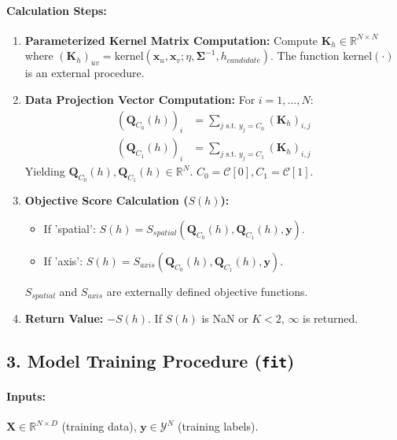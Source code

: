 \documentclass{article}
\newcommand{\mat}[1]{\mathbf{#1}} %
\newcommand{\vecbf}[1]{\bm{#1}} %
\begin{document}
\paragraph{Calculation Steps:}
\begin{enumerate}
    \item \textbf{Parameterized Kernel Matrix Computation:}
    Compute $\mat{K}_h \in \mathbb{R}^{N \times N}$ where $(\mat{K}_h)_{uv} = \text{kernel}(\vecbf{x}_u, \vecbf{x}_v; \eta, \mat{\Sigma}^{-1}, h_{candidate})$.
    The function $\text{kernel}(\cdot)$ is an external procedure.

    \item \textbf{Data Projection Vector Computation:} For $i=1, \dots, N$:
    \begin{align*}
        (\vecbf{Q}_{C_0}(h))_i &= \sum_{j \text{ s.t. } y_j = C_0} (\mat{K}_h)_{i,j} \\
        (\vecbf{Q}_{C_1}(h))_i &= \sum_{j \text{ s.t. } y_j = C_1} (\mat{K}_h)_{i,j}
    \end{align*}
    Yielding $\vecbf{Q}_{C_0}(h), \vecbf{Q}_{C_1}(h) \in \mathbb{R}^N$. $C_0 = \mathcal{C}[0], C_1 = \mathcal{C}[1]$.

    \item \textbf{Objective Score Calculation ($S(h)$):}
    \begin{itemize}
        \item If 'spatial': $S(h) = S_{spatial}(\vecbf{Q}_{C_0}(h), \vecbf{Q}_{C_1}(h), \vecbf{y})$.
        \item If 'axis': $S(h) = S_{axis}(\vecbf{Q}_{C_0}(h), \vecbf{Q}_{C_1}(h), \vecbf{y})$.
    \end{itemize}
    $S_{spatial}$ and $S_{axis}$ are externally defined objective functions.

    \item \textbf{Return Value:} $-S(h)$. If $S(h)$ is NaN or $K<2$, $\infty$ is returned.
\end{enumerate}

\subsection*{3. Model Training Procedure (\texttt{fit})}
\paragraph{Inputs:} $\mat{X} \in \mathbb{R}^{N \times D}$ (training data), $\vecbf{y} \in \mathcal{Y}^N$ (training labels).
\end{document}
